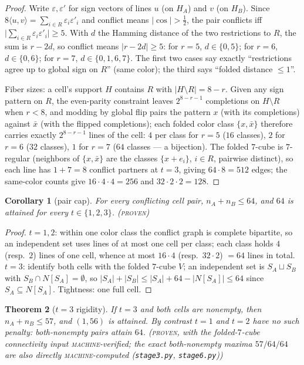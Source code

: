 \documentclass[11pt]{article}
\newtheorem{theorem}{Theorem}
\newtheorem{corollary}[theorem]{Corollary}
\theoremstyle{remark}
\begin{document}
\begin{proof}
Write $\varepsilon,\varepsilon'$ for sign vectors of lines $u$ (on $H_A$)
and $v$ (on $H_B$). Since $8\langle u,v\rangle=\sum_{i\in R}
\varepsilon_i\varepsilon'_i$ and conflict means $|\cos|>\tfrac12$, the
pair conflicts iff $\bigl|\sum_{i\in R}\varepsilon_i\varepsilon'_i\bigr|
\ge5$. With $d$ the Hamming distance of the two restrictions to $R$, the
sum is $r-2d$, so conflict means $|r-2d|\ge 5$: for $r=5$, $d\in\{0,5\}$;
for $r=6$, $d\in\{0,6\}$; for $r=7$, $d\in\{0,1,6,7\}$. The first two
cases say exactly ``restrictions agree up to global sign on $R$'' (same
color); the third says ``folded distance $\le1$''.

Fiber sizes: a cell's support $H$ contains $R$ with $|H\setminus R|=8-r$.
Given any sign pattern on $R$, the even-parity constraint leaves
$2^{8-r-1}$ completions on $H\setminus R$ when $r<8$, and modding by
global flip pairs the pattern $x$ (with its completions) against $\bar x$
(with the flipped completions); each folded color class
$\{x,\bar x\}$ therefore carries exactly $2^{8-r-1}$ lines of the cell:
$4$ per class for $r=5$ ($16$ classes), $2$ for $r=6$ ($32$ classes), $1$
for $r=7$ ($64$ classes --- a bijection). The folded $7$-cube is
$7$-regular (neighbors of $\{x,\bar x\}$ are the classes $\{x+e_i\}$,
$i\in R$, pairwise distinct), so each line has $1+7=8$ conflict partners
at $t=3$, giving $64\cdot8=512$ edges; the same-color counts give
$16\cdot4\cdot4=256$ and $32\cdot2\cdot2=128$.
\end{proof}

\begin{corollary}[pair cap]\label{cor:kappa}
For every conflicting cell pair, $n_A+n_B\le 64$, and $64$ is attained for
every $t\in\{1,2,3\}$. \textsc{(proven)}
\end{corollary}

\begin{proof}
$t=1,2$: within one color class the conflict graph is complete bipartite,
so an independent set uses lines of at most one cell per class; each class
holds $4$ (resp.\ $2$) lines of one cell, whence at most $16\cdot4$
(resp.\ $32\cdot2$) $=64$ lines in total. $t=3$: identify both cells with
the folded $7$-cube $V$; an independent set is $S_A\sqcup S_B$ with $S_B
\cap N[S_A]=\emptyset$, so $|S_A|+|S_B|\le|S_A|+64-|N[S_A]|\le 64$ since
$S_A\subseteq N[S_A]$. Tightness: one full cell.
\end{proof}

\begin{theorem}[$t=3$ rigidity]\label{thm:rigid}
If $t=3$ and \emph{both} cells are nonempty, then $n_A+n_B\le 57$, and
$(1,56)$ is attained. By contrast $t=1$ and $t=2$ have no such penalty:
both-nonempty pairs attain $64$.
\textsc{(proven}, with the folded-$7$-cube connectivity input
\textsc{machine}-verified; the exact both-nonempty maxima
$57/64/64$ are also directly \textsc{machine}-computed
(\texttt{stage3.py}, \texttt{stage6.py})\textsc{)}
\end{theorem}
\end{document}
